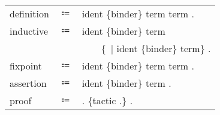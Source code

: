 \begin{table}[!htb]
\begin{tabular}{lcl}
        definition
            &$\Coloneqq$&\fDefinition{} ident \{binder\} \scolon{} term \scoloneq{} term .\\
        inductive
            &$\Coloneqq$&\fInductive{} ident \{binder\} \scolon{} term \scoloneq{}\\
            &&~~~~\{~$\mid$ ident \{binder\} \scolon{} term\} .\\
        fixpoint
            &$\Coloneqq$&\fFixpoint{} ident \{binder\} \scolon{} term \scoloneq{} term .\\
        assertion
            &$\Coloneqq$&\fTheorem{} ident \{binder\} \scolon{} term .\\
        proof
            &$\Coloneqq$&\fProof{} . \{tactic .\} \fQed{} .\\
    \end{tabular}
\end{table}
\newpage

